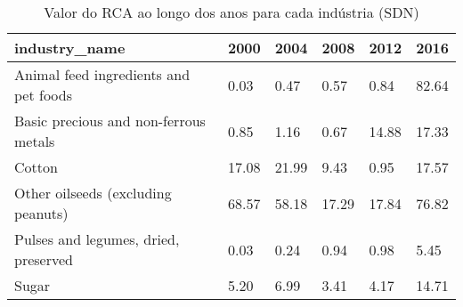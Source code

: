 \begin{table}
\centering
\caption{Valor do RCA ao longo dos anos para cada indústria (SDN)}
\begin{tabular}{p{6cm}p{1.5cm}p{1.5cm}p{1.5cm}p{1.5cm}p{1.5cm}}
\toprule
                        industry\_name &  2000 &  2004 &  2008 &  2012 &  2016 \\
\midrule
Animal feed ingredients and pet foods &  0.03 &  0.47 &  0.57 &  0.84 & 82.64 \\
Basic precious and non-ferrous metals &  0.85 &  1.16 &  0.67 & 14.88 & 17.33 \\
                               Cotton & 17.08 & 21.99 &  9.43 &  0.95 & 17.57 \\
   Other oilseeds (excluding peanuts) & 68.57 & 58.18 & 17.29 & 17.84 & 76.82 \\
 Pulses and legumes, dried, preserved &  0.03 &  0.24 &  0.94 &  0.98 &  5.45 \\
                                Sugar &  5.20 &  6.99 &  3.41 &  4.17 & 14.71 \\
\bottomrule
\end{tabular}
\end{table}
